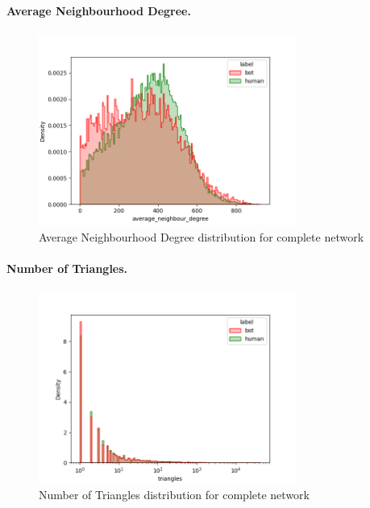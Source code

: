 \documentclass[12pt, a4paper]{article}
\begin{document}
		\paragraph{Average Neighbourhood Degree.}
		\mbox{}
		\begin{figure}[H]
			\centering
            \includegraphics[width=0.75\textwidth]{results/complete_average_neighbour_degree.png}
            \caption{Average Neighbourhood Degree distribution for complete network}
        \end{figure}
        \newpage
        \paragraph{Number of Triangles.}
        \mbox{}
        \begin{figure}[H]
        	\centering
            \includegraphics[width=0.75\textwidth]{results/complete_triangles.png}
            \caption{Number of Triangles distribution for complete network}
        \end{figure}
\end{document}
